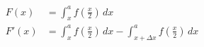 \documentclass{article}
\begin{document}
  \begin{align*}
    F\left(x\right) &= \int_{x}^{a} f\left(\frac{x}{2}\right) \,dx \\
    F'\left(x\right) &= \int_{x}^{a} f\left(\frac{x}{2}\right) \,dx
                        -\int_{x + \Delta{x}}^{a} f\left(\frac{x}{2}\right) \,dx
  \end{align*}
\end{document}
